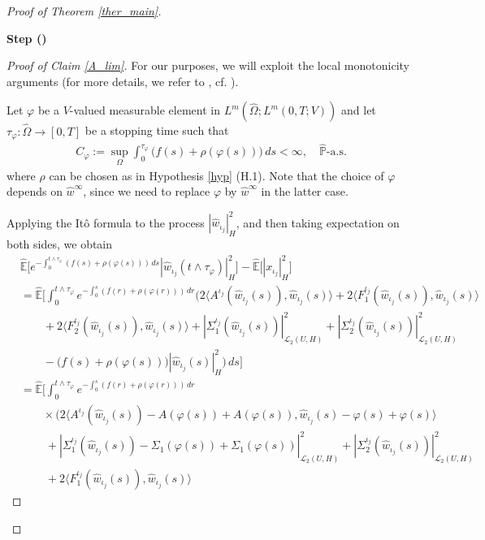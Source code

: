 \documentclass[english,a4paper,11pt]{amsart}
\theoremstyle{plain}
\theoremstyle{definition}
\theoremstyle{remark}
\numberwithin{equation}{section}
\newcounter{lil1}
\newenvironment{step}
{\begin{list} { \bf Step (\Roman{lil1})}
		{ \usecounter{lil1}
			\setlength{\leftmargin}{0.0cm}
			\setlength{\topsep}{0.2cm}
			\setlength{\itemsep}{0.0cm}
			\setlength{\parsep}{0.1cm}
			\setlength{\itemindent}{0.8cm}
			\setlength{\parskip}{0.0cm}}}
	{\end{list}}
\newcounter{lil33}
\newcounter{lil1q}
\newcommand{\wh}{\widehat}
\newcommand{\la}{\langle}
\newcommand{\ra}{\rangle}
\newcommand{\PP}{{\mathbb{P}}}
\newcommand{\EE}{ \mathbb{E} }
\begin{document}
\begin{proof}[Proof of Theorem \ref{ther_main}]
\begin{step}
\begin{proof}[Proof of Claim \ref{A_lim}]
For our purposes, we will exploit the local monotonicity arguments (for more details, we refer to \cite[Chapter 5]{weiroeckner}, cf. \cite{AKMTM4}).

Let $\varphi$ be a $V$-valued measurable element in $L^m(\wh{\Omega};L^m(0,T;V))$ and let $\tau_\varphi:\wh{\Omega} \to  [0,T]$ be a stopping time such that 
\begin{align*}
	C_\varphi:= \sup_{\Omega}\int_0^{\tau_\varphi}\big(f(s)+\rho(\varphi(s))\big)\,ds<\infty, \quad \wh{\PP}\text{-a.s.}
\end{align*}where $\rho$ can be chosen as in Hypothesis \ref{hyp} (H.1). Note that the choice of $\varphi$ depends on $\wh{w}^\infty$, since we need to replace $\varphi$ by $\wh{w}^\infty$ in the latter case.

Applying the It\^o formula to the process $ | \wh{w}_{\iota_j} | _H^2$, and then taking expectation on both sides, we obtain 
\begin{align}\label{436}\nonumber
	&	  {\wh{\EE}}\Big[e^{-\int_0^{t\wedge \tau_\varphi}(f(s)+\rho(\varphi(s)))\,ds} | {\wh{w}}_{{\iota_j}}(t\wedge \tau_{\varphi}) | _H^2\Big]-	  {\wh{\EE}}\Big[ | x_{{\iota_j}} | _H^2\Big]
	\\
	& \nonumber=  {\wh{\EE}} \bigg[\int_0^{t\wedge \tau_{\varphi}}e^{-\int_0^{s}(f(r)+\rho(\varphi(r)))\, dr} \bigg(2\la A^{\iota_j}( {\wh{w}}_{{\iota_j}}(s)), {\wh{w}}_{{\iota_j}}(s)\ra+2\la F_1^{\iota_j}(\wh{w}_{\iota_j}(s)),\wh{w}_{\iota_j}(s)\ra\\&\nonumber\qquad + 2\la F_2^{\iota_j}(\wh{w}_{\iota_j}(s)),\wh{w}_{\iota_j}(s)\ra
	 + | \Sigma_1^{{\iota_j}}(  {\wh{w}}_{{\iota_j}}(s)) | _{\mathcal{L}_2(U,H)}^2+ | \Sigma_2^{{\iota_j}}(  {\wh{w}}_{{\iota_j}}(s)) | _{\mathcal{L}_2(U,H)}^2\\&\nonumber\qquad-\big(f(s)+\rho(\varphi(s))\big) | \wh{w}_{\iota_j}(s) | _H^2 \bigg)\,ds\bigg]
	\\& \nonumber=  {\wh{\EE}} \bigg[\int_0^{t\wedge \tau_{\varphi}}e^{-\int_0^{s}(f(r)+\rho(\varphi(r)))\, dr}\\&\qquad \times \nonumber \bigg(2\la A^{\iota_j}( {\wh{w}}_{{\iota_j}}(s))-A(\varphi(s))+A(\varphi(s)), {\wh{w}}_{{\iota_j}}(s)-\varphi(s)+\varphi(s)\ra
	\\&\qquad \ \nonumber 
	+ | \Sigma_1^{{\iota_j}}(  {\wh{w}}_{{\iota_j}}(s))-\Sigma_1(\varphi(s))+\Sigma_1(\varphi(s)) | _{\mathcal{L}_2(U,H)}^2+ | \Sigma_2^{{\iota_j}}(  {\wh{w}}_{{\iota_j}}(s)) | _{\mathcal{L}_2(U,H)}^2
		\\&\qquad \ \nonumber+2\la F_1^{\iota_j}(\wh{w}_{\iota_j}(s)),\wh{w}_{\iota_j}(s)\ra

\end{align}
\end{proof}
\end{step}
\end{proof}
\end{document}
